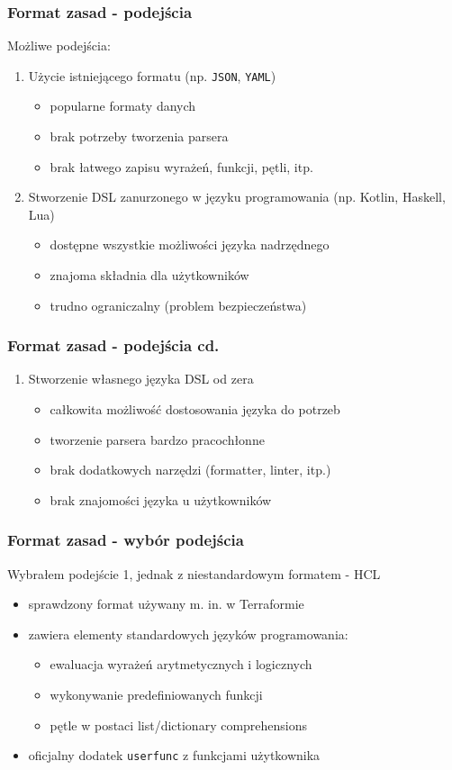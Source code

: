 \documentclass{beamer}
\newcommand\pro{\item[$+$]}
\newcommand\con{\item[$-$]}
\newcounter{saveenumi}
\newcommand{\seti}{\setcounter{saveenumi}{\value{enumi}}}
\newcommand{\conti}{\setcounter{enumi}{\value{saveenumi}}}
\begin{document}
\begin{frame}
   \frametitle{Format zasad - podejścia}
   Możliwe podejścia:
   \begin{enumerate}
      \item Użycie istniejącego formatu (np. {\tt JSON}, {\tt YAML})
            \begin{itemize}
               \pro popularne formaty danych
               \pro brak potrzeby tworzenia parsera
               \con brak łatwego zapisu wyrażeń, funkcji, pętli, itp.
            \end{itemize}
      \item Stworzenie DSL zanurzonego w języku programowania (np. Kotlin, Haskell, Lua)
            \begin{itemize}
               \pro dostępne wszystkie możliwości języka nadrzędnego
               \pro znajoma składnia dla użytkowników
               \con trudno ograniczalny (problem bezpieczeństwa)
            \end{itemize}
      \seti
   \end{enumerate}
\end{frame}

\begin{frame}
   \frametitle{Format zasad - podejścia cd.}
   \begin{enumerate}
      \conti
      \item Stworzenie własnego języka DSL od zera
            \begin{itemize}
               \pro całkowita możliwość dostosowania języka do potrzeb
               \con tworzenie parsera bardzo pracochłonne
               \con brak dodatkowych narzędzi (formatter, linter, itp.)
               \con brak znajomości języka u użytkowników
            \end{itemize}
   \end{enumerate}
\end{frame}

\begin{frame}
   \frametitle{Format zasad - wybór podejścia}
   Wybrałem podejście 1, jednak z niestandardowym formatem - HCL
   \begin{itemize}
      \item sprawdzony format używany m. in. w Terraformie
      \item zawiera elementy standardowych języków programowania:
      \begin{itemize}
         \item ewaluacja wyrażeń arytmetycznych i logicznych
         \item wykonywanie predefiniowanych funkcji
         \item pętle w postaci list/dictionary comprehensions
      \end{itemize}
      \item oficjalny dodatek {\tt userfunc} z funkcjami użytkownika
   \end{itemize}
\end{frame}
\end{document}
